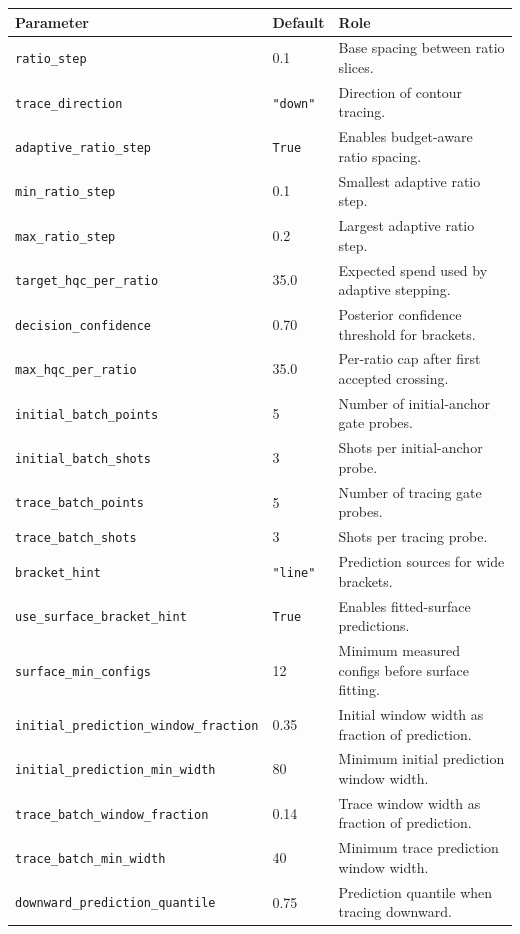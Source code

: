 \documentclass[11pt]{article}
\begin{document}
\begin{table}[h]
\centering
\begin{tabular}{lll}
\toprule
Parameter & Default & Role \\
\midrule
\texttt{ratio\_step} & 0.1 & Base spacing between ratio slices. \\
\texttt{trace\_direction} & \texttt{"down"} & Direction of contour tracing. \\
\texttt{adaptive\_ratio\_step} & \texttt{True} & Enables budget-aware ratio spacing. \\
\texttt{min\_ratio\_step} & 0.1 & Smallest adaptive ratio step. \\
\texttt{max\_ratio\_step} & 0.2 & Largest adaptive ratio step. \\
\texttt{target\_hqc\_per\_ratio} & 35.0 & Expected spend used by adaptive stepping. \\
\texttt{decision\_confidence} & 0.70 & Posterior confidence threshold for brackets. \\
\texttt{max\_hqc\_per\_ratio} & 35.0 & Per-ratio cap after first accepted crossing. \\
\texttt{initial\_batch\_points} & 5 & Number of initial-anchor gate probes. \\
\texttt{initial\_batch\_shots} & 3 & Shots per initial-anchor probe. \\
\texttt{trace\_batch\_points} & 5 & Number of tracing gate probes. \\
\texttt{trace\_batch\_shots} & 3 & Shots per tracing probe. \\
\texttt{bracket\_hint} & \texttt{"line"} & Prediction sources for wide brackets. \\
\texttt{use\_surface\_bracket\_hint} & \texttt{True} & Enables fitted-surface predictions. \\
\texttt{surface\_min\_configs} & 12 & Minimum measured configs before surface fitting. \\
\texttt{initial\_prediction\_window\_fraction} & 0.35 & Initial window width as fraction of prediction. \\
\texttt{initial\_prediction\_min\_width} & 80 & Minimum initial prediction window width. \\
\texttt{trace\_batch\_window\_fraction} & 0.14 & Trace window width as fraction of prediction. \\
\texttt{trace\_batch\_min\_width} & 40 & Minimum trace prediction window width. \\
\texttt{downward\_prediction\_quantile} & 0.75 & Prediction quantile when tracing downward. \\

\end{tabular}
\end{table}
\end{document}
